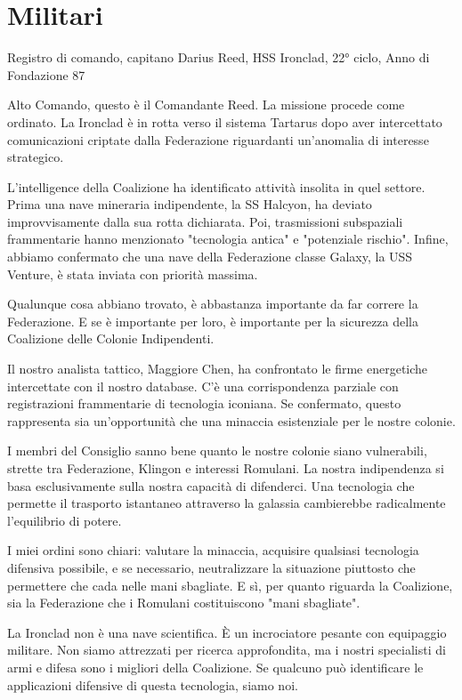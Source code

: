 \documentclass[letterpaper,twocolumn,openany,nodeprecatedcode]{dndbook}
\begin{document}
\chapter{Militari}
\begin{DndReadAloud}
Registro di comando, capitano Darius Reed, HSS Ironclad, 22° ciclo, Anno di Fondazione 87
    
Alto Comando, questo è il Comandante Reed. La missione procede come ordinato. La Ironclad è in rotta verso il sistema Tartarus dopo aver intercettato comunicazioni criptate dalla Federazione riguardanti un'anomalia di interesse strategico.

L'intelligence della Coalizione ha identificato attività insolita in quel settore. Prima una nave mineraria indipendente, la SS Halcyon, ha deviato improvvisamente dalla sua rotta dichiarata. Poi, trasmissioni subspaziali frammentarie hanno menzionato "tecnologia antica" e "potenziale rischio". Infine, abbiamo confermato che una nave della Federazione classe Galaxy, la USS Venture, è stata inviata con priorità massima.

Qualunque cosa abbiano trovato, è abbastanza importante da far correre la Federazione. E se è importante per loro, è importante per la sicurezza della Coalizione delle Colonie Indipendenti.

Il nostro analista tattico, Maggiore Chen, ha confrontato le firme energetiche intercettate con il nostro database. C'è una corrispondenza parziale con registrazioni frammentarie di tecnologia iconiana. Se confermato, questo rappresenta sia un'opportunità che una minaccia esistenziale per le nostre colonie.

I membri del Consiglio sanno bene quanto le nostre colonie siano vulnerabili, strette tra Federazione, Klingon e interessi Romulani. La nostra indipendenza si basa esclusivamente sulla nostra capacità di difenderci. Una tecnologia che permette il trasporto istantaneo attraverso la galassia cambierebbe radicalmente l'equilibrio di potere.

I miei ordini sono chiari: valutare la minaccia, acquisire qualsiasi tecnologia difensiva possibile, e se necessario, neutralizzare la situazione piuttosto che permettere che cada nelle mani sbagliate. E sì, per quanto riguarda la Coalizione, sia la Federazione che i Romulani costituiscono "mani sbagliate".

La Ironclad non è una nave scientifica. È un incrociatore pesante con equipaggio militare. Non siamo attrezzati per ricerca approfondita, ma i nostri specialisti di armi e difesa sono i migliori della Coalizione. Se qualcuno può identificare le applicazioni difensive di questa tecnologia, siamo noi.


\end{DndReadAloud}
\end{document}
